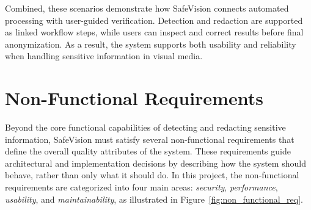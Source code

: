 Combined, these scenarios demonstrate how \gls{SafeVision} connects automated processing with user-guided verification. Detection and redaction are supported as linked workflow steps, while users can inspect and correct results before final \gls{anonymization}. As a result, the system supports both usability and reliability when handling sensitive information in visual media.


\section{Non-Functional Requirements}
\label{sec:nfr}

Beyond the core functional capabilities of detecting and redacting sensitive information, \gls{SafeVision} must satisfy several non-functional requirements that define the overall quality attributes of the system. These requirements guide architectural and implementation decisions by describing how the system should behave, rather than only what it should do. In this project, the non-functional requirements are categorized into four main areas: \textit{security}, \textit{performance}, \textit{usability}, and \textit{maintainability}, as illustrated in Figure~\ref{fig:non_functional_req}.

